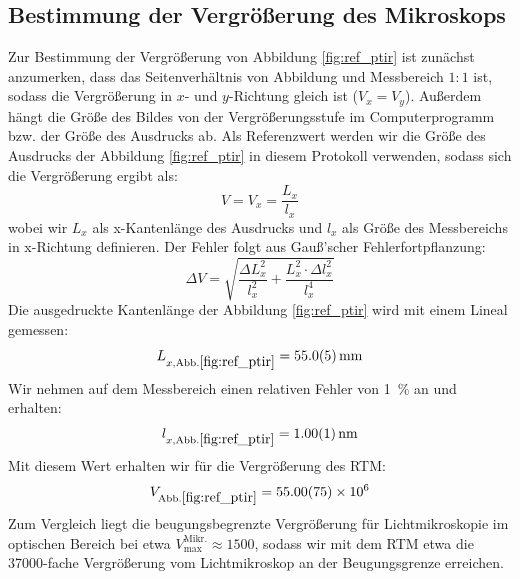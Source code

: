 \documentclass[10pt, a4paper]{article}
\begin{document}
\subsection{Bestimmung der Vergrößerung des Mikroskops}
Zur Bestimmung der Vergrößerung von Abbildung \ref{fig:ref_ptir} ist zunächst anzumerken, dass das Seitenverhältnis von Abbildung und Messbereich $1:1$ ist, sodass die Vergrößerung in $x$- und $y$-Richtung gleich ist ($V_x = V_y$). Außerdem hängt die Größe des Bildes von der Vergrößerungsstufe im Computerprogramm bzw. der Größe des Ausdrucks ab. Als Referenzwert werden wir die Größe des Ausdrucks der Abbildung \ref{fig:ref_ptir} in diesem Protokoll verwenden, sodass sich die Vergrößerung ergibt als:
\begin{equation}
  V = V_x = \frac{L_x}{l_x}
\end{equation}
wobei wir $L_x$ als x-Kantenlänge des Ausdrucks und $l_x$ als Größe des Messbereichs in x-Richtung definieren.
Der Fehler folgt aus Gauß'scher Fehlerfortpflanzung:
\begin{equation}
  \Delta V = \sqrt{\frac{\Delta L_x ^2}{l_x^2} + \frac{L_x^2 \cdot \Delta l_x^2}{l_x^4}}
\end{equation}
Die ausgedruckte Kantenlänge der Abbildung \ref{fig:ref_ptir} wird mit einem Lineal gemessen:
\begin{equation*}
  L_{x,\mathrm{Abb.\ref{fig:ref_ptir}}} = \SI{55 +- 0,5}{\milli\metre}
\end{equation*}
Wir nehmen auf dem Messbereich einen relativen Fehler von \SI{1}{\percent} an und erhalten:
\begin{align*}
  l_{x,\mathrm{Abb.\ref{fig:ref_ptir}}} = \SI{1,00 +- 0,01}{\nano\metre}
\end{align*}
Mit diesem Wert erhalten wir für die Vergrößerung des RTM:
\begin{align*}
  V_\mathrm{Abb.\ref{fig:ref_ptir}} = \num{55,0 +- 0,75e6}
\end{align*}
Zum Vergleich liegt die beugungsbegrenzte Vergrößerung für Lichtmikroskopie im optischen Bereich bei etwa $V_\mathrm{max}^\mathrm{Mikr.} \approx \num{1500}$, sodass wir mit dem RTM etwa die \num{37000}-fache Vergrößerung vom Lichtmikroskop an der Beugungsgrenze erreichen.
\end{document}
